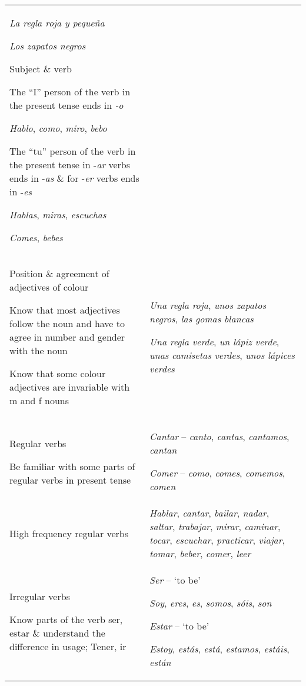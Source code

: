 \documentclass[output=paper]{langscibook}
\begin{document}
\begin{longtable}{ *2{p{}} }
\textit{La regla roja y pequeña} 

\textit{Los zapatos negros}

Subject \& verb

The “I” person of the verb in the present tense ends in \textit{-o}

\textit{Hablo}, \textit{como}, \textit{miro}, \textit{bebo}

The “tu” person of the verb in the present tense in -\textit{ar} verbs ends in -\textit{as} \& for -\textit{er} verbs ends in -\textit{es}

\textit{Hablas}, \textit{miras}, \textit{escuchas}

\textit{Comes}, \textit{bebes}\\
\tablevspace
Position \& agreement of adjectives of colour

Know that most adjectives follow the noun and have to agree in number and gender with the noun

Know that some colour adjectives are invariable with m and f nouns & \textit{Una regla roja}, \textit{unos zapatos negros}, \textit{las gomas blancas}

\textit{Una regla verde}, \textit{un lápiz verde}, \textit{unas camisetas verdes}, \textit{unos lápices verdes}\\
\tablevspace
Regular verbs

Be familiar with some parts of regular verbs in present tense & \textit{Cantar} -- \textit{canto}, \textit{cantas}, \textit{cantamos}, \textit{cantan}

\textit{Comer} -- \textit{como}, \textit{comes}, \textit{comemos}, \textit{comen}\\


High frequency regular verbs &	\textit{Hablar}, \textit{cantar}, \textit{bailar}, \textit{nadar}, \textit{saltar}, \textit{trabajar}, \textit{mirar}, \textit{caminar}, \textit{tocar}, \textit{escuchar}, \textit{practicar}, \textit{viajar}, \textit{tomar}, \textit{beber}, \textit{comer}, \textit{leer}\\
\tablevspace
Irregular verbs

Know parts of the verb ser, estar \& understand the difference in usage;
Tener, ir &	\textit{Ser} -- `to be'

\textit{Soy}, \textit{eres}, \textit{es}, \textit{somos}, \textit{sóis}, \textit{son}

\textit{Estar} -- `to be'

\textit{Estoy}, \textit{estás}, \textit{está}, \textit{estamos}, \textit{estáis}, \textit{están}


\end{longtable}
\end{document}
